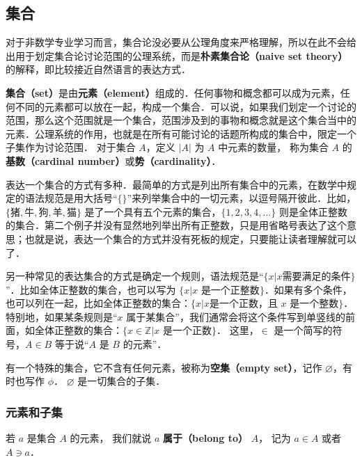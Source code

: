 

\subsection{集合}

对于非数学专业学习而言，集合论没必要从公理角度来严格理解，所以在此不会给出用于划定集合论讨论范围的公理系统，而是\textbf{朴素集合论（naive set theory）}的解释，即比较接近自然语言的表达方式．

\textbf{集合（set）}是由\textbf{元素（element）}组成的．任何事物和概念都可以成为元素，任何不同的元素都可以放在一起，构成一个集合．可以说，如果我们划定一个讨论的范围，那么这个范围就是一个集合，范围涉及到的事物和概念就是这个集合当中的元素．公理系统的作用，也就是在所有可能讨论的话题所构成的集合中，限定一个子集作为讨论范围． 对于集合 $A$，定义 $|A|$ 为 $A$ 中元素的数量， 称为集合 $A$ 的\textbf{基数（cardinal number）}或\textbf{势（cardinality）}．

表达一个集合的方式有多种．最简单的方式是列出所有集合中的元素，在数学中规定的语法规范是用大括号“$\{\}$”来列举集合中的一切元素，以逗号隔开彼此．比如，$\{\text{猪}, \text{牛}, \text{狗}, \text{羊}, \text{猫}\}$ 是了一个具有五个元素的集合，$\{1,2,3,4,\dots\}$ 则是全体正整数的集合．第二个例子并没有显然地列举出所有正整数，只是用省略号表达了这个意思；也就是说，表达一个集合的方式并没有死板的规定，只要能让读者理解就可以了．

另一种常见的表达集合的方式是确定一个规则，语法规范是“$\{x|x \text{需要满足的条件}\}$”．比如全体正整数的集合，也可以写为 $\{x|\text{$x$ 是一个正整数}\}$．如果有多个条件，也可以列在一起，比如全体正整数的集合：$\{x|x \text{是一个正数，且 $x$ 是一个整数}\}$．特别地，如果某条规则是“$x$ 属于某集合”，我们通常会将这个条件写到单竖线的前面，如全体正整数的集合：$\{x\in\mathbb{Z}|\text{$x$ 是一个正数}\}$． 这里，$\in$ 是一个简写的符号，$A\in B$ 等于说“$A$ 是 $B$ 的元素”．

有一个特殊的集合，它不含有任何元素，被称为\textbf{空集（empty set）}，记作 $\varnothing$，有时也写作 $\phi$． $\varnothing$ 是一切集合的子集．

\subsubsection{元素和子集}
若 $a$ 是集合 $A$ 的元素， 我们就说 $a$ \textbf{属于（belong to）} $A$， 记为 $a \in A$ 或者 $A \ni a$．

